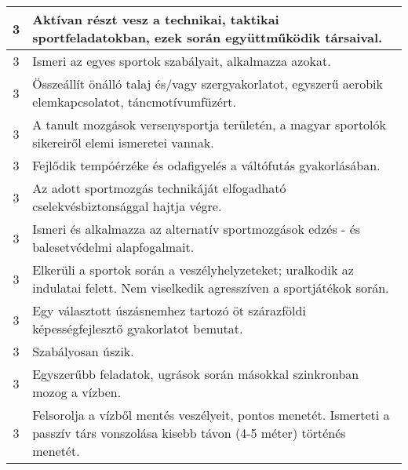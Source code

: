 \begin{longtable}{c | p{12cm} }
                                
                                          3 &  Aktívan részt vesz a technikai, taktikai sportfeladatokban, ezek során együttműködik társaival. \\ \hline
                                          3 &  Ismeri az egyes sportok szabályait, alkalmazza azokat. \\ \hline
                                          3 &  Összeállít önálló talaj és/vagy szergyakorlatot, egyszerű aerobik elemkapcsolatot, táncmotívumfüzért. \\ \hline
                                          3 &  A tanult mozgások versenysportja területén, a magyar sportolók sikereiről elemi ismeretei vannak. \\ \hline
                                          3 &  Fejlődik tempóérzéke és odafigyelés a váltófutás gyakorlásában. \\ \hline
                                          3 &  Az adott sportmozgás technikáját elfogadható cselekvésbiztonsággal hajtja végre. \\ \hline
                                          3 &  Ismeri és alkalmazza az alternatív sportmozgások edzés - és balesetvédelmi alapfogalmait. \\ \hline
                                          3 &  Elkerüli a sportok során a veszélyhelyzeteket; uralkodik az indulatai felett. Nem viselkedik agresszíven a sportjátékok során. \\ \hline
                                          3 &  Egy választott úszásnemhez tartozó öt szárazföldi képességfejlesztő gyakorlatot bemutat. \\ \hline
                                          3 &  Szabályosan úszik. \\ \hline
                                          3 &  Egyszerűbb feladatok, ugrások során másokkal szinkronban mozog a vízben. \\ \hline
                                          3 &  Felsorolja a vízből mentés veszélyeit, pontos menetét. Ismerteti a passzív társ vonszolása kisebb távon (4-5 méter) történés menetét. \\ \hline
                                      

\end{longtable}
